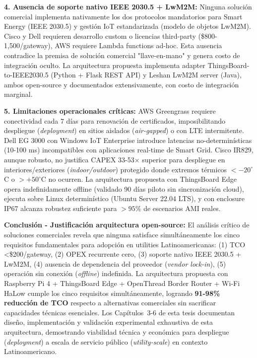 \textbf{4. Ausencia de soporte nativo IEEE 2030.5 + LwM2M:} Ninguna solución comercial implementa nativamente los dos protocolos mandatorios para Smart Energy (IEEE 2030.5) y gestión IoT estandarizada (modelo de objetos LwM2M). Cisco y Dell requieren desarrollo custom o licencias third-party (\$800-1,500/gateway), AWS requiere Lambda functions ad-hoc. Esta ausencia contradice la premisa de solución comercial "llave-en-mano" y genera costo de integración oculto. La arquitectura propuesta implementa adapter ThingsBoard-to-IEEE2030.5 (Python + Flask REST API) y Leshan LwM2M server (Java), ambos open-source y documentados extensivamente, con costo de integración marginal.

\textbf{5. Limitaciones operacionales críticas:} AWS Greengrass requiere conectividad cada 7 días para renovación de certificados, imposibilitando despliegue (\textit{deployment}) en sitios aislados (\textit{air-gapped}) o con LTE intermitente. Dell EG 3000 con Windows IoT Enterprise introduce latencias no-determinísticas (10-100 ms) incompatibles con aplicaciones real-time de Smart Grid. Cisco IR829, aunque robusto, no justifica CAPEX 33-53$\times$ superior para despliegue en interiores/exteriores (\textit{indoor/outdoor}) protegido donde extremos térmicos $<-20^\circ$C o $>+50^\circ$C no ocurren. La arquitectura propuesta con ThingsBoard Edge opera indefinidamente offline (validado 90 días piloto sin sincronización cloud), ejecuta sobre Linux determinístico (Ubuntu Server 22.04 LTS), y con enclosure IP67 alcanza robustez suficiente para $>95\%$ de escenarios AMI reales.

\textbf{Conclusión - Justificación arquitectura open-source:} El análisis crítico de soluciones comerciales revela que ninguna satisface simultáneamente los cinco requisitos fundamentales para adopción en utilities Latinoamericanas: (1) TCO <\$200/gateway, (2) OPEX recurrente cero, (3) soporte nativo IEEE 2030.5 + LwM2M, (4) ausencia de dependencia del proveedor (\textit{vendor lock-in}), (5) operación sin conexión (\textit{offline}) indefinida. La arquitectura propuesta con Raspberry Pi 4 + ThingsBoard Edge + OpenThread Border Router + Wi-Fi HaLow cumple los cinco requisitos simultáneamente, logrando \textbf{91-98\% reducción de TCO} respecto a alternativas comerciales sin sacrificar capacidades técnicas esenciales. Los Capítulos~3-6 de esta tesis documentan diseño, implementación y validación experimental exhaustiva de esta arquitectura, demostrando viabilidad técnica y económica para despliegue (\textit{deployment}) a escala de servicio público (\textit{utility-scale}) en contexto Latinoamericano.

